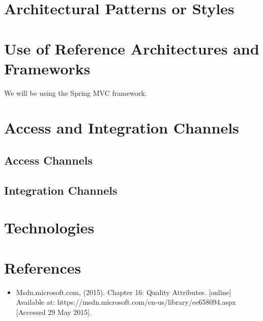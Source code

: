 \documentclass[11pt,a4paper,titlepage]{article}
\begin{document}
	
\section{Architectural Patterns or Styles}
	


\section{Use of Reference Architectures and Frameworks}
We will be using the Spring MVC framework.

\section{Access and Integration Channels}
\subsection{Access Channels}
	
\subsection{Integration Channels}
	
	
\section{Technologies}



\section{References}
\begin{itemize}
	\item Msdn.microsoft.com, (2015). Chapter 16: Quality Attributes. [online]
	 Available at: https://msdn.microsoft.com/en-us/library/ee658094.aspx [Accessed 29 May 2015].
\end{itemize}
\end{document}
